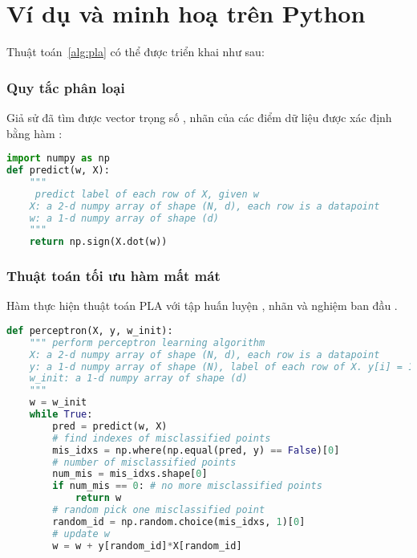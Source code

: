  

\section{Ví dụ và minh hoạ trên Python}
Thuật toán~\ref{alg:pla} có thể được triển khai như sau:

\subsubsection{Quy tắc phân loại}
Giả sử đã tìm được vector trọng số , nhãn của các điểm dữ liệu  được xác định bằng hàm :    
\begin{lstlisting}[language=Python]
import numpy as np 
def predict(w, X):  
    """
     predict label of each row of X, given w
    X: a 2-d numpy array of shape (N, d), each row is a datapoint 
    w: a 1-d numpy array of shape (d)  
    """
    return np.sign(X.dot(w))
\end{lstlisting}
\subsubsection{Thuật toán tối ưu hàm mất mát}
Hàm  thực hiện thuật toán PLA với tập
huấn luyện , nhãn  và nghiệm ban đầu
.

\begin{lstlisting}[language=Python]
def perceptron(X, y, w_init):
    """ perform perceptron learning algorithm
    X: a 2-d numpy array of shape (N, d), each row is a datapoint 
    y: a 1-d numpy array of shape (N), label of each row of X. y[i] = 1/-1
    w_init: a 1-d numpy array of shape (d) 
    """
    w = w_init
    while True:
        pred = predict(w, X)
        # find indexes of misclassified points
        mis_idxs = np.where(np.equal(pred, y) == False)[0]
        # number of misclassified points
        num_mis = mis_idxs.shape[0]
        if num_mis == 0: # no more misclassified points
            return w
        # random pick one misclassified point 
        random_id = np.random.choice(mis_idxs, 1)[0]
        # update w 
        w = w + y[random_id]*X[random_id]
\end{lstlisting}



